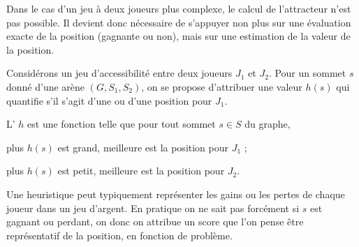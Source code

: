 \documentclass[12pt,fancy]{cours}
\begin{document}

Dans le cas d'un jeu à deux joueurs plus complexe, le calcul de l’attracteur n'est pas possible.
 Il devient donc nécessaire de s'appuyer non plus sur une évaluation exacte de la position (gagnante ou non), mais sur
une estimation de la valeur de la position.







Considérons un jeu d’accessibilité entre deux joueurs $J_1$ et $J_2$.
Pour un sommet $s$ donné d’une arène $(G,S_1,S_2)$, on se propose d’attribuer une valeur $h(s)$ qui quantifie s’il s’agit d’une  ou d’une  position pour $J_1$.
\begin{definition}
L’ $h$ est une fonction telle que pour tout sommet $s \in S$ du graphe,
\begin{liste}
\item plus $h(s)$ est grand, meilleure est la position pour $J_1$ ;
\item plus $h(s)$ est petit, meilleure est la position pour $J_2$.
\end{liste}
\end{definition}
Une heuristique peut typiquement représenter les gains ou les pertes de chaque joueur dans un jeu d'argent.
En pratique on ne sait pas forcément si $s$ est gagnant ou perdant, on donc on attribue un score que l’on pense être représentatif de la position, en fonction de problème.
\end{document}
